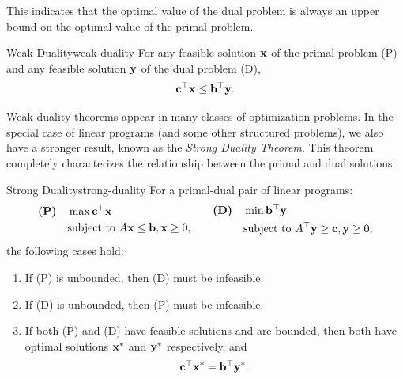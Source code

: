 This indicates that the optimal value of the dual problem is always an upper bound on the optimal value of the primal problem.

\begin{theorem}{Weak Duality}{weak-duality}
For any feasible solution $\mathbf{x}$ of the primal problem (P) and any feasible solution $\mathbf{y}$ of the dual problem (D), 
\[
\mathbf{c}^\top \mathbf{x} \leq \mathbf{b}^\top \mathbf{y}.
\]
\end{theorem}

Weak duality theorems appear in many classes of optimization problems. In the special case of linear programs (and some other structured problems), we also have a stronger result, known as the \emph{Strong Duality Theorem}. This theorem completely characterizes the relationship between the primal and dual solutions:

\begin{theorem}{Strong Duality}{strong-duality}
For a primal-dual pair of linear programs:
\[
\begin{aligned}
\textbf{(P)} \quad &\max \mathbf{c}^\top \mathbf{x} \\
&\mbox{subject to } A \mathbf{x} \leq \mathbf{b}, \mathbf{x} \geq 0,
\end{aligned}
\quad\quad
\begin{aligned}
\textbf{(D)} \quad &\min \mathbf{b}^\top \mathbf{y} \\
&\mbox{subject to } A^\top \mathbf{y} \geq \mathbf{c}, \mathbf{y} \geq 0,
\end{aligned}
\]
the following cases hold:
\begin{enumerate}
\item  If (P) is unbounded, then (D) must be infeasible.
\item  If (D) is unbounded, then (P) must be infeasible.
\item  If both (P) and (D) have feasible solutions and are bounded, then both have optimal solutions $\mathbf{x}^*$ and $\mathbf{y}^*$ respectively, and 
\[
\mathbf{c}^\top \mathbf{x}^* = \mathbf{b}^\top \mathbf{y}^*.
\]
\end{enumerate}
\end{theorem}

